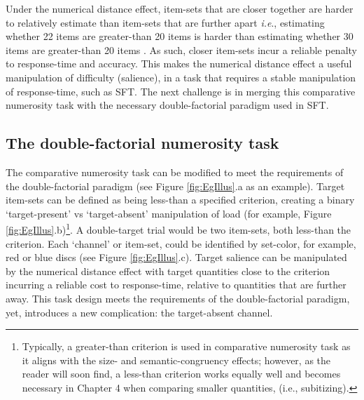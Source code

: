 Under the numerical distance effect, item-sets that are closer together are harder to relatively estimate than item-sets that are further apart \emph{i.e}., estimating whether 22 items are greater-than 20 items is harder than estimating whether 30 items are greater-than 20 items \cite{moyer1967time}. As such, closer item-sets incur a reliable penalty to response-time and accuracy. This makes the numerical distance effect a useful manipulation of difficulty (salience), in a task that requires a stable manipulation of response-time, such as SFT. The next challenge is in merging this comparative numerosity task with the necessary double-factorial paradigm used in SFT. 

\subsection{The double-factorial numerosity task}
The comparative numerosity task can be modified to meet the requirements of the double-factorial paradigm (see Figure \ref{fig:EgIllus}.a as an example). Target item-sets can be defined as being less-than a specified criterion, creating a binary `target-present' vs `target-absent' manipulation of load (for example, Figure \ref{fig:EgIllus}.b)\footnote{Typically, a greater-than criterion is used in comparative numerosity task \cite{piazza2004,price2012,libertus2016, leibovich2014comparing,pansky2002comparative} as it aligns with the size- and semantic-congruency effects; however, as the reader will soon find, a less-than criterion works equally well and becomes necessary in Chapter 4 when comparing smaller quantities, (i.e., subitizing).}. A double-target trial would be two item-sets, both less-than the criterion. Each `channel' or item-set, could be identified by set-color, for example, red or blue discs (see Figure \ref{fig:EgIllus}.c). Target salience can be manipulated by the numerical distance effect with target quantities close to the criterion incurring a reliable cost to response-time, relative to quantities that are further away. This task design meets the requirements of the double-factorial paradigm, yet, introduces a new complication: the target-absent channel.

